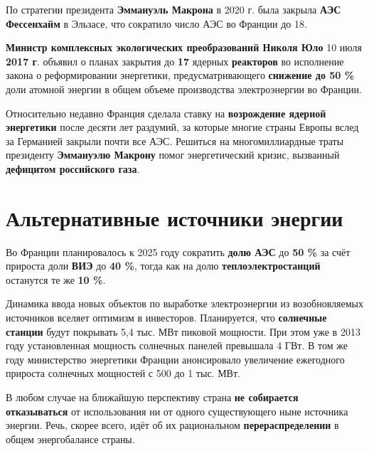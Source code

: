 По стратегии президента \textbf{Эммануэль Макрона} в 2020 г. была закрыла \textbf{АЭС Фессенхайм} в Эльзасе, что сократило число АЭС во Франции до 18.

\textbf{Министр комплексных экологических преобразований Николя Юло} 10  июля \textbf{2017 г}. объявил о  планах закрытия
до \textbf{17} ядерных \textbf{реакторов} во исполнение закона о реформировании
энергетики, предусматривающего \textbf{снижение до 50 \% }доли атомной
энергии в общем объеме производства электроэнергии во Франции.

Относительно недавно Франция сделала ставку на \textbf{возрождение ядерной энергетики} после десяти лет раздумий, за которые многие страны Европы вслед за Германией закрыли почти все АЭС. Решиться на многомиллиардные траты президенту \textbf{Эммануэлю Макрону} помог энергетический кризис, вызванный \textbf{дефицитом российского газа}.

\section{Альтернативные источники энергии}

Во Франции планировалось к 2025 году сократить \textbf{долю АЭС} до \textbf{50 \%} за счёт прироста доли \textbf{ВИЭ} до\textbf{ 40 \%}, тогда как на долю \textbf{теплоэлектростанций} останутся те же \textbf{10 \%}.

Динамика ввода новых объектов по выработке электроэнергии из возобновляемых источников вселяет оптимизм в инвесторов. Планируется, что \textbf{солнечные станции} будут покрывать 5,4 тыс. МВт пиковой мощности. При этом уже в 2013 году установленная мощность солнечных панелей превышала 4 ГВт. В том же году министерство энергетики Франции анонсировало увеличение ежегодного прироста солнечных мощностей с 500 до 1 тыс. МВт.

В любом случае на ближайшую перспективу страна \textbf{не собирается отказываться} от использования ни от одного существующего ныне источника энергии. Речь, скорее всего, идёт об их рациональном \textbf{перераспределении} в общем энергобалансе страны.

